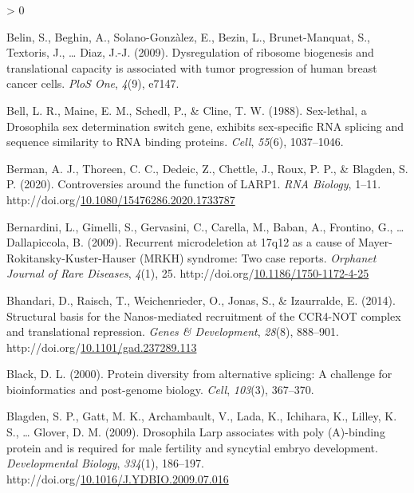 \documentclass[12pt,oneside]{reedthesis}
\newlength{\cslhangindent}
\newenvironment{CSLReferences}[2] %
 {%
  \setlength{\parindent}{0pt}
  \ifodd #1 \everypar{\setlength{\hangindent}{\cslhangindent}}\ignorespaces\fi
  \ifnum #2 > 0
  \setlength{\parskip}{#2\baselineskip}
  \fi
 }%
 {}
\begin{document}
\begin{CSLReferences}{1}{0}
\leavevmode\hypertarget{ref-Belin2009a}{}%
Belin, S., Beghin, A., Solano-Gonzàlez, E., Bezin, L., Brunet-Manquat, S., Textoris, J., \ldots{} Diaz, J.-J. (2009). Dysregulation of ribosome biogenesis and translational capacity is associated with tumor progression of human breast cancer cells. \emph{PloS One}, \emph{4}(9), e7147.

\leavevmode\hypertarget{ref-Bell1988}{}%
Bell, L. R., Maine, E. M., Schedl, P., \& Cline, T. W. (1988). Sex-lethal, a {Drosophila} sex determination switch gene, exhibits sex-specific {RNA} splicing and sequence similarity to {RNA} binding proteins. \emph{Cell}, \emph{55}(6), 1037--1046.

\leavevmode\hypertarget{ref-bermanControversiesFunctionLARP12020}{}%
Berman, A. J., Thoreen, C. C., Dedeic, Z., Chettle, J., Roux, P. P., \& Blagden, S. P. (2020). Controversies around the function of {LARP1}. \emph{RNA Biology}, 1--11. http://doi.org/\href{https://doi.org/10.1080/15476286.2020.1733787}{10.1080/15476286.2020.1733787}

\leavevmode\hypertarget{ref-bernardiniRecurrentMicrodeletion17q122009}{}%
Bernardini, L., Gimelli, S., Gervasini, C., Carella, M., Baban, A., Frontino, G., \ldots{} Dallapiccola, B. (2009). Recurrent microdeletion at 17q12 as a cause of {Mayer}-{Rokitansky}-{Kuster}-{Hauser} ({MRKH}) syndrome: Two case reports. \emph{Orphanet Journal of Rare Diseases}, \emph{4}(1), 25. http://doi.org/\href{https://doi.org/10.1186/1750-1172-4-25}{10.1186/1750-1172-4-25}

\leavevmode\hypertarget{ref-Bhandari2014h}{}%
Bhandari, D., Raisch, T., Weichenrieder, O., Jonas, S., \& Izaurralde, E. (2014). Structural basis for the {Nanos}-mediated recruitment of the {CCR4}-{NOT} complex and translational repression. \emph{Genes \& Development}, \emph{28}(8), 888--901. http://doi.org/\href{https://doi.org/10.1101/gad.237289.113}{10.1101/gad.237289.113}

\leavevmode\hypertarget{ref-Black2000}{}%
Black, D. L. (2000). Protein diversity from alternative splicing: A challenge for bioinformatics and post-genome biology. \emph{Cell}, \emph{103}(3), 367--370.

\leavevmode\hypertarget{ref-Blagden2009f}{}%
Blagden, S. P., Gatt, M. K., Archambault, V., Lada, K., Ichihara, K., Lilley, K. S., \ldots{} Glover, D. M. (2009). Drosophila {Larp} associates with poly ({A})-binding protein and is required for male fertility and syncytial embryo development. \emph{Developmental Biology}, \emph{334}(1), 186--197. http://doi.org/\href{https://doi.org/10.1016/J.YDBIO.2009.07.016}{10.1016/J.YDBIO.2009.07.016}


\end{CSLReferences}
\end{document}
